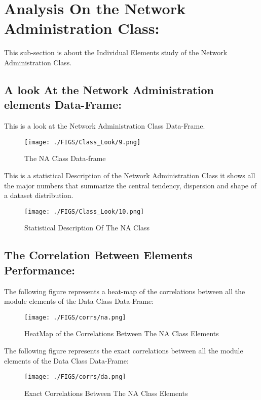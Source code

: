 \documentclass[12pt]{extreport}
\begin{document}
\section{Analysis On the Network Administration Class:}
This sub-section is about the Individual Elements study of the Network Administration Class. 

\subsection{A look At the Network Administration elements Data-Frame:}


This is a look at the Network Administration Class Data-Frame.

\begin{figure}[H]
	\centering
	\texttt{[image: ./FIGS/Class\_Look/9.png]}
	\caption{The NA Class Data-frame}
	\label{fig:69}
\end{figure}


This is a statistical Description of the Network Administration Class it shows all the major numbers that summarize the central tendency, dispersion and shape of a dataset distribution.

\begin{figure}[H]
	\centering
	\texttt{[image: ./FIGS/Class\_Look/10.png]}
	\caption{Statistical Description Of The NA Class}
	\label{fig:70}
\end{figure}



\subsection{The Correlation Between Elements Performance:}

The following figure represents a heat-map of the correlations between all the module elements of the Data Class Data-Frame:

\begin{figure}[H]
	\centering
	\texttt{[image: ./FIGS/corrs/na.png]}
	\caption{HeatMap of the Correlations Between The NA Class Elements}
	\label{fig:71}
\end{figure}

The following figure represents the exact  correlations between all the module elements of the Data Class Data-Frame:

\begin{figure}[H]
	\centering
	\texttt{[image: ./FIGS/corrs/da.png]}
	\caption{Exact Correlations Between The NA Class Elements}
	\label{fig:b}
\end{figure}
\end{document}
